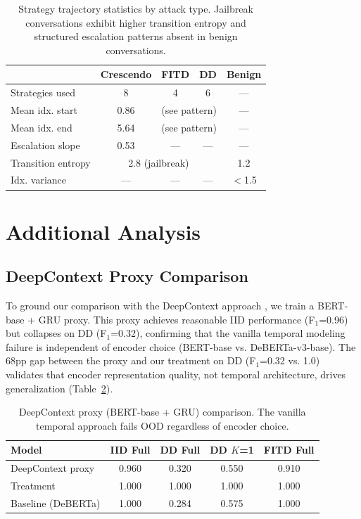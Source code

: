 \documentclass[11pt,a4paper]{article}
\newcommand{\fone}{F$_1$}
\begin{document}
\begin{table}[t]
\centering
\caption{Strategy trajectory statistics by attack type. Jailbreak conversations exhibit higher transition entropy and structured escalation patterns absent in benign conversations.}
\label{tab:transitions}
\begin{tabular}{lcccc}
\toprule
 & Crescendo & FITD & DD & Benign \\
\midrule
Strategies used & 8 & 4 & 6 & --- \\
Mean idx. start & 0.86 & \multicolumn{2}{c}{(see pattern)} & --- \\
Mean idx. end & 5.64 & \multicolumn{2}{c}{(see pattern)} & --- \\
Escalation slope & 0.53 & --- & --- & --- \\
Transition entropy & \multicolumn{3}{c}{2.8 (jailbreak)} & 1.2 \\
Idx. variance & --- & --- & --- & $<$1.5 \\
\bottomrule
\end{tabular}
\end{table}


\section{Additional Analysis}

\subsection{DeepContext Proxy Comparison}

To ground our comparison with the DeepContext approach \citep{su2026}, we train a BERT-base + GRU proxy.
This proxy achieves reasonable IID performance (\fone{}=0.96) but collapses on DD (\fone{}=0.32), confirming that the vanilla temporal modeling failure is independent of encoder choice (BERT-base vs. DeBERTa-v3-base).
The 68pp gap between the proxy and our treatment on DD (\fone{}=0.32 vs. 1.0) validates that encoder representation quality, not temporal architecture, drives generalization (Table~\ref{tab:proxy}).

\begin{table}[t]
\centering
\caption{DeepContext proxy (BERT-base + GRU) comparison. The vanilla temporal approach fails OOD regardless of encoder choice.}
\label{tab:proxy}
\begin{tabular}{lcccc}
\toprule
Model & IID Full & DD Full & DD $K$=1 & FITD Full \\
\midrule
DeepContext proxy & 0.960 & 0.320 & 0.550 & 0.910 \\
Treatment         & 1.000 & 1.000 & 1.000 & 1.000 \\
Baseline (DeBERTa) & 1.000 & 0.284 & 0.575 & 1.000 \\
\bottomrule
\end{tabular}
\end{table}
\end{document}
